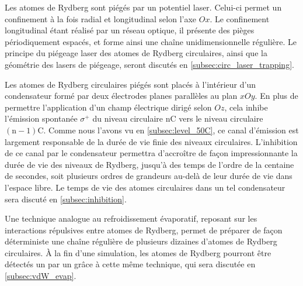 Les atomes de Rydberg sont piégés par un potentiel laser.
Celui-ci permet un confinement à la fois radial et longitudinal selon l'axe $Ox$.
Le confinement longitudinal étant réalisé par un réseau optique, il présente des pièges périodiquement espacés, et forme ainsi une chaîne unidimensionnelle régulière.
Le principe du piégeage laser des atomes de Rydberg circulaires, ainsi que la géométrie des lasers de piégeage, seront discutés en \ref{subsec:circ_laser_trapping}.

Les atomes de Rydberg circulaires piégés sont placés à l'intérieur d'un condensateur formé par deux électrodes planes parallèles au plan $xOy$.
En plus de permettre l'application d'un champ électrique dirigé selon $Oz$, cela inhibe l'émission spontanée $\sigma^+$ du niveau circulaire $\mathrm{nC}$ vers le niveau circulaire $\mathrm{(n-1)C}$.
Comme nous l'avons vu en \ref{subsec:level_50C}, ce canal d'émission est largement responsable de la durée de vie finie des niveaux circulaires.
L'inhibition de ce canal par le condensateur permettra d'accroître de façon impressionnante la durée de vie des niveaux de Rydberg, jusqu'à des temps de l'ordre de la centaine de secondes, soit plusieurs ordres de grandeurs au-delà de leur durée de vie dans l'espace libre.
Le temps de vie des atomes circulaires dans un tel condensateur sera discuté en \ref{subsec:inhibition}.

Une technique analogue au refroidissement évaporatif, reposant sur les interactions répulsives entre atomes de Rydberg, permet de préparer de façon déterministe une chaîne régulière de plusieurs dizaines d'atomes de Rydberg circulaires.
\`A la fin d'une simulation, les atomes de Rydberg pourront être détectés un par un grâce à cette même technique, qui sera discutée en \ref{subsec:vdW_evap}.

